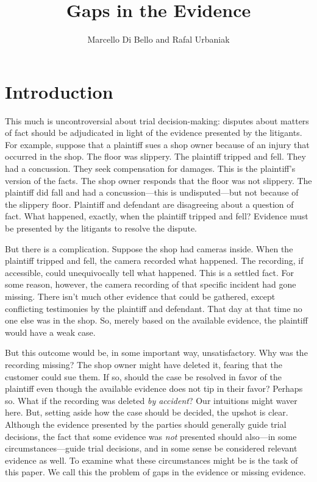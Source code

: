 \documentclass[
  10pt,
  dvipsnames,enabledeprecatedfontcommands]{scrartcl}
\title{Gaps in the Evidence}
\author{Marcello Di Bello and Rafal Urbaniak}
\date{}
\begin{document}
\maketitle

\tableofcontents

\hypertarget{introduction}{%
\section{Introduction}\label{introduction}}

This much is uncontroversial about trial decision-making: disputes about
matters of fact should be adjudicated in light of the evidence presented
by the litigants. For example, suppose that a plaintiff sues a shop
owner because of an injury that occurred in the shop. The floor was
slippery. The plaintiff tripped and fell. They had a concussion. They
seek compensation for damages. This is the plaintiff's version of the
facts. The shop owner responds that the floor was not slippery. The
plaintiff did fall and had a concussion---this is undisputed---but not
because of the slippery floor. Plaintiff and defendant are disagreeing
about a question of fact. What happened, exactly, when the plaintiff
tripped and fell? Evidence must be presented by the litigants to resolve
the dispute.

But there is a complication. Suppose the shop had cameras inside. When
the plaintiff tripped and fell, the camera recorded what happened. The
recording, if accessible, could unequivocally tell what happened. This
is a settled fact. For some reason, however, the camera recording of
that specific incident had gone missing. There isn't much other evidence
that could be gathered, except conflicting testimonies by the plaintiff
and defendant. That day at that time no one else was in the shop. So,
merely based on the available evidence, the plaintiff would have a weak
case.

But this outcome would be, in some important way, unsatisfactory. Why
was the recording missing? The shop owner might have deleted it, fearing
that the customer could sue them. If so, should the case be resolved in
favor of the plaintiff even though the available evidence does not tip
in their favor? Perhaps so. What if the recording was deleted \emph{by
accident}? Our intuitions might waver here. But, setting aside how the
case should be decided, the upshot is clear. Although the evidence
presented by the parties should generally guide trial decisions, the
fact that some evidence was \textit{not} presented should also---in some
circumstances---guide trial decisions, and in some sense be considered
relevant evidence as well. To examine what these circumstances might be
is the task of this paper. We call this the problem of gaps in the
evidence or missing evidence.
\end{document}
